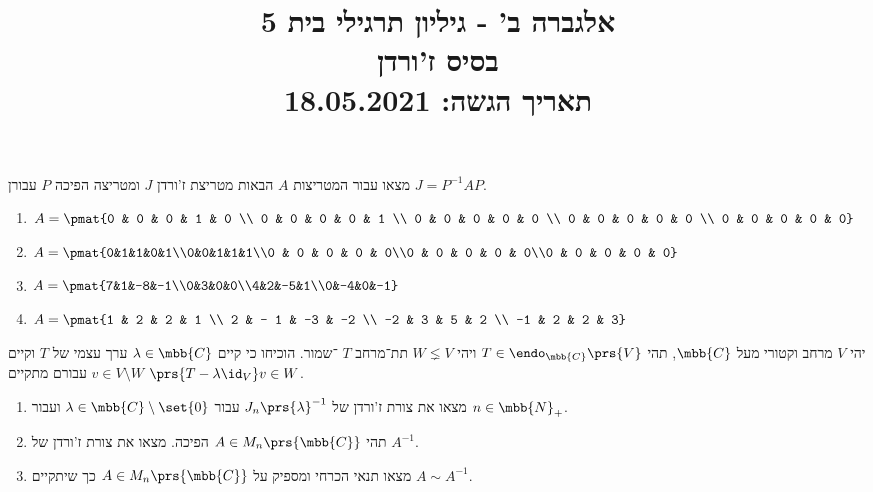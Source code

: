 \documentclass[a4paper,10pt,twoside,openany]{article}
\title{
אלגברה ב' - גיליון תרגילי בית 5 \\
בסיס ז'ורדן
\\
\small{תאריך הגשה: 18.05.2021}
}
\date{}
\begin{document}
\maketitle

\begin{exercise}%
מצאו עבור המטריצות
$A$
הבאות מטריצת ז'ורדן
$J$
ומטריצה הפיכה
$P$
עבורן
$J = P^{-1} A P$.

\begin{enumerate}
\item
$A = \pmat{0 & 0 & 0 & 1 & 0 \\ 0 & 0 & 0 & 0 & 1 \\ 0 & 0 & 0 & 0 & 0 \\ 0 & 0 & 0 & 0 & 0 \\ 0 & 0 & 0 & 0 & 0}$
\item $A = \pmat{0&1&1&0&1\\0&0&1&1&1\\0 & 0 & 0 & 0 & 0\\0 & 0 & 0 & 0 & 0\\0 & 0 & 0 & 0 & 0}$
\item $A = \pmat{7&1&-8&-1\\0&3&0&0\\4&2&-5&1\\0&-4&0&-1}$
\item $A=\pmat{1 & 2 & 2 & 1 \\ 2 & - 1 & -3 & -2 \\ -2 & 3 & 5 & 2 \\ -1 & 2 & 2 & 3}$
\end{enumerate}
\end{exercise}

\begin{exercise}%
יהי
$V$
מרחב וקטורי מעל
$\mbb{C}$,
תהי
$T \in \endo_{\mbb{C}}\prs{V}$
ויהי
$W \lneq V$
תת־מרחב
$T$%
־שמור.
הוכיחו כי קיים
$\lambda \in \mbb{C}$
ערך עצמי של 
$T$
וקיים
$v \in V \setminus W$
עבורם מתקיים
$\prs{T-\lambda \id_V} v \in W$.
\end{exercise}

\begin{exercise}%
\begin{enumerate}
\item מצאו את צורת ז'ורדן של
$J_n\prs{\lambda}^{-1}$
עבור
$\lambda \in \mbb{C}\setminus\set{0}$
ועבור
$n \in \mbb{N}_+$.

\item תהי
$A \in M_n\prs{\mbb{C}}$
הפיכה.
מצאו את צורת ז'ורדן של
$A^{-1}$.

\item מצאו תנאי הכרחי ומספיק על
$A \in M_n\prs{\mbb{C}}$
כך שיתקיים
$A \sim A^{-1}$.
\end{enumerate}
\end{exercise}
\end{document}

